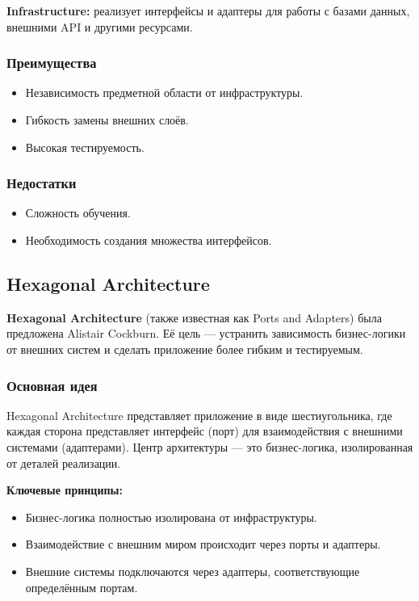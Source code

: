 \textbf{Infrastructure:} реализует интерфейсы и адаптеры для работы с базами данных, внешними API и другими ресурсами.

\subsubsection{Преимущества}
\begin{itemize}
    \item Независимость предметной области от инфраструктуры.
    \item Гибкость замены внешних слоёв.
    \item Высокая тестируемость.
\end{itemize}

\subsubsection{Недостатки}
\begin{itemize}
    \item Сложность обучения.
    \item Необходимость создания множества интерфейсов.
\end{itemize}

\subsection{Hexagonal Architecture}
\textbf{Hexagonal Architecture} (также известная как Ports and Adapters) была предложена Alistair Cockburn. Её цель — устранить зависимость бизнес-логики от внешних систем и сделать приложение более гибким и тестируемым.

\subsubsection{Основная идея}
Hexagonal Architecture представляет приложение в виде шестиугольника, где каждая сторона представляет интерфейс (порт) для взаимодействия с внешними системами (адаптерами). Центр архитектуры — это бизнес-логика, изолированная от деталей реализации.

\textbf{Ключевые принципы:}
\begin{itemize}
    \item Бизнес-логика полностью изолирована от инфраструктуры.
    \item Взаимодействие с внешним миром происходит через порты и адаптеры.
    \item Внешние системы подключаются через адаптеры, соответствующие определённым портам.
\end{itemize}

